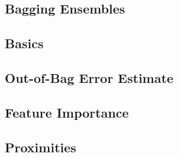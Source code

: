 

\subsection{Bagging Ensembles}


\subsection{Basics}


\subsection{Out-of-Bag Error Estimate}


\subsection{Feature Importance}


\subsection{Proximities}


% 
